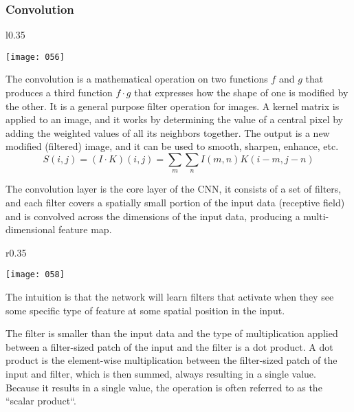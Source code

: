 \subsubsection{Convolution}
\begin{wrapfigure}{l}{0.35\textwidth}
    \begin{center}
        \texttt{[image: 056]}
        \caption{}
    \end{center}
    \label{fig:056}
\end{wrapfigure}

The convolution is a mathematical operation on two functions \(f\) and \(g\) that produces a third function \(f \cdot g\) that expresses how the shape of one is modified by the other. It is a general purpose filter operation for images. A kernel matrix is applied to an image, and it works by determining the value of a central pixel by adding the weighted values of all its neighbors together. The output is a new modified (filtered) image, and it can be used to smooth, sharpen, enhance, etc.
\begin{equation}
    S(i,j) = (I \cdot K)(i,j) = \sum_m \sum_n I(m,n)K(i-m,j-n)
\end{equation}

The convolution layer is the core layer of the CNN, it consists of a set of filters, and each filter covers a spatially small portion of the input data (receptive field) and is convolved across the dimensions of the input data, producing a multi-dimensional feature map.

\begin{wrapfigure}{r}{0.35\textwidth}
    \begin{center}
        \texttt{[image: 058]}
        \caption{}
    \end{center}
    \label{fig:058}
\end{wrapfigure}

The intuition is that the network will learn filters that activate when they see some specific type of feature at some spatial position in the input.

The filter is smaller than the input data and the type of multiplication applied between a filter-sized patch of the input and the filter is a dot product. A dot product is the element-wise multiplication between the filter-sized patch of the input and filter, which is then summed, always resulting in a single value. Because it results in a single value, the operation is often referred to as the “scalar product“.

